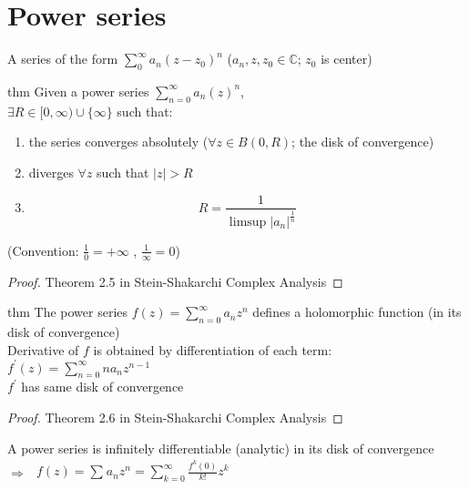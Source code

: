 \section{\textbf{Power series}} 
\begin{defn}
A series of the form $\sum_{0}^{\infty} a_n(z-z_0)^n$ ($a_n,z,z_0\in \mathds{C}$; $z_0$ is center)
\end{defn}
\begin{restatable}{thm}{}\label{}
Given a power series $\sum_{n=0}^{\infty} a_n(z)^n$,\\
$\exists R\in [0,\infty) \cup \{\infty\}$ such that:
\begin{enumerate}
\item the series converges absolutely ($\forall z\in B(0,R)$; the disk of convergence)
\item diverges $\forall z$ such that $|z|>R$ 
\item \begin{equation} R=\frac{1}{\limsup |a_n|^{\frac{1}{n}}}\nonumber \end{equation}
\end{enumerate}
(Convention: $\frac{1}{0}=+\infty$ , $\frac{1}{\infty}=0$)
\end{restatable}
\begin{proof}
Theorem 2.5 in Stein-Shakarchi Complex Analysis
\end{proof}
\begin{restatable}[]{thm}{}\label{}
The power series $f(z)=\sum_{n=0}^{\infty} a_nz^n$ defines a holomorphic function (in its disk of convergence)\\
Derivative of $f$ is obtained by differentiation of each term:\\
$f^{'}(z)=\sum_{n=0}^{\infty} na_nz^{n-1}$ \\
$f^{'}$ has same disk of convergence
\end{restatable}
\begin{proof}
Theorem 2.6 in Stein-Shakarchi Complex Analysis
\end{proof}
\begin{rem}
A power series is infinitely differentiable (analytic) in its disk of convergence\\  
$\Rightarrow$ \hspace{40mm}$ \begin{aligned} f(z)=\sum_{}^{}a_nz^n =\sum_{k=0}^{\infty} \frac{f^{k}(0)}{k!} z^k \nonumber\\ \end{aligned}$
\end{rem}
